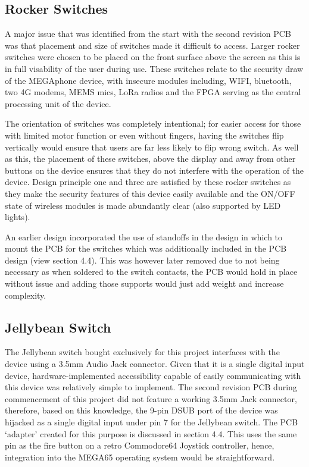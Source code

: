 \subsection{Rocker Switches}

A major issue that was identified from the start with the second revision PCB was that placement and size of switches made it difficult to access.
Larger rocker switches were chosen to be placed on the front surface above the screen as this is in full visability of the user during use.
These switches relate to the security draw of the MEGAphone device, with insecure modules including, WIFI, bluetooth, two 4G modems, MEMS mics, LoRa radios and the FPGA serving as the central processing unit of the device.

The orientation of switches was completely intentional; for easier access for those with limited motor function or even without fingers, having the switches flip vertically would ensure that users are far less likely to flip wrong switch.
As well as this, the placement of these switches, above the display and away from other buttons on the device ensures that they do not interfere with the operation of the device.
Design principle one and three are satisfied by these rocker switches as they make the security features of this device easily available and the ON/OFF state of wireless modules is made abundantly clear (also supported by LED lights).

An earlier design incorporated the use of standoffs in the design in which to mount the PCB for the switches which was additionally included in the PCB design (view section 4.4). %
This was however later removed due to not being necessary as when soldered to the switch contacts, the PCB would hold in place without issue and adding those supports would just add weight and increase complexity.

\subsection{Jellybean Switch}

The Jellybean switch bought exclusively for this project interfaces with the device using a 3.5mm Audio Jack connector. 
Given that it is a single digital input device, hardware-implemented accessibility capable of easily communicating with this device was relatively simple to implement. 
The second revision PCB during commencement of this project did not feature a working 3.5mm Jack connector, therefore, based on this knowledge, the 9-pin DSUB port of the device was hijacked as a single digital input under pin 7 for the Jellybean switch. 
The PCB ‘adapter’ created for this purpose is discussed in section 4.4. %
This uses the same pin as the fire button on a retro Commodore64 Joystick controller, hence, integration into the MEGA65 operating system would be straightforward.

